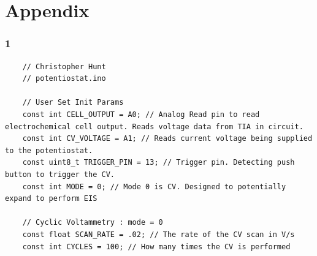 \documentclass{article}
\begin{document}
\newpage
\section*{Appendix}
\subsubsection*{1}
\begin{lstlisting}
    // Christopher Hunt
    // potentiostat.ino
    
    // User Set Init Params
    const int CELL_OUTPUT = A0; // Analog Read pin to read electrochemical cell output. Reads voltage data from TIA in circuit.
    const int CV_VOLTAGE = A1; // Reads current voltage being supplied to the potentiostat.
    const uint8_t TRIGGER_PIN = 13; // Trigger pin. Detecting push button to trigger the CV.
    const int MODE = 0; // Mode 0 is CV. Designed to potentially expand to perform EIS
    
    // Cyclic Voltammetry : mode = 0
    const float SCAN_RATE = .02; // The rate of the CV scan in V/s
    const int CYCLES = 100; // How many times the CV is performed
    

\end{lstlisting}
\end{document}

